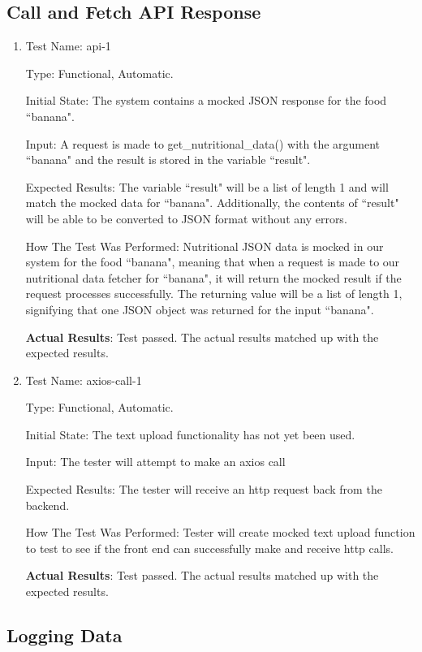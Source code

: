 \documentclass[12pt, titlepage]{article}
\begin{document}
	\subsection{Call and Fetch API Response}
	\begin{enumerate}
		\item{Test Name: api-1}
		
		Type: Functional, Automatic.
		
		Initial State: The system contains a mocked JSON response for the food ``banana".
		
		Input: A request is made to get\_nutritional\_data() with the argument ``banana" and the result is stored in the variable ``result".
		
		Expected Results: The variable ``result" will be a list of length 1 and will match the mocked data for ``banana". Additionally, the contents of ``result" will be able to be converted to JSON format without any errors.
		
		How The Test Was Performed: Nutritional JSON data is mocked in our system for the food ``banana", meaning that when a request is made to our nutritional data fetcher for ``banana", it will return the mocked result if the request processes successfully. The returning value will be a list of length 1, signifying that one JSON object was returned for the input ``banana".
		
		\textbf{Actual Results}: Test passed. The actual results matched up with the expected results.
		
		\item{Test Name: axios-call-1}
		
		Type: Functional, Automatic.
		
		Initial State: The text upload functionality has not yet been used.
		
		Input: The tester will attempt to make an axios call
		
		Expected Results: The tester will receive an http request back from the backend.
		
		How The Test Was Performed: Tester will create mocked text upload function to test to see if the front end can successfully make and receive http calls. 
		
		\textbf{Actual Results}: Test passed. The actual results matched up with the expected results.
	\end{enumerate}

	\subsection{Logging Data}
\end{document}

